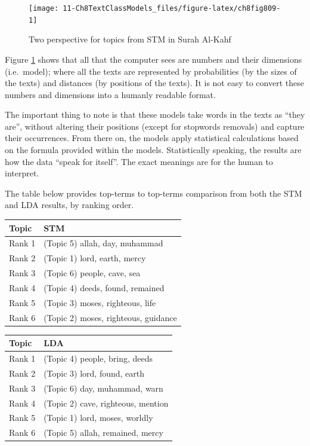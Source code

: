 \documentclass[
]{article}
\begin{document}
\begin{figure}

{\centering \texttt{[image: 11-Ch8TextClassModels\_files/figure-latex/ch8fig809-1]} 

}

\caption{Two perspective for topics from STM in Surah Al-Kahf}\label{fig:ch8fig809}
\end{figure}

Figure \ref{fig:ch8fig809} shows that all that the computer sees are numbers and their dimensions (i.e.~model); where all the texts are represented by probabilities (by the sizes of the texts) and distances (by positions of the texts). It is not easy to convert these numbers and dimensions into a humanly readable format.

The important thing to note is that these models take words in the texts as ``they are'', without altering their positions (except for stopwords removals) and capture their occurrences. From there on, the models apply statistical calculations based on the formula provided within the models. Statistically speaking, the results are how the data ``speak for itself''. The exact meanings are for the human to interpret.

The table below provides top-terms to top-terms comparison from both the STM and LDA results, by ranking order.

\begin{longtable}[]{@{}ll@{}}
\toprule\noalign{}
Topic & STM \\
\midrule\noalign{}
\endhead
\bottomrule\noalign{}
\endlastfoot
Rank 1 & (Topic 5) allah, day, muhammad \\
Rank 2 & (Topic 1) lord, earth, mercy \\
Rank 3 & (Topic 6) people, cave, sea \\
Rank 4 & (Topic 4) deeds, found, remained \\
Rank 5 & (Topic 3) moses, righteous, life \\
Rank 6 & (Topic 2) moses, righteous, guidance \\
\end{longtable}

\begin{longtable}[]{@{}ll@{}}
\toprule\noalign{}
Topic & LDA \\
\midrule\noalign{}
\endhead
\bottomrule\noalign{}
\endlastfoot
Rank 1 & (Topic 4) people, bring, deeds \\
Rank 2 & (Topic 3) lord, found, earth \\
Rank 3 & (Topic 6) day, muhammad, warn \\
Rank 4 & (Topic 2) cave, righteous, mention \\
Rank 5 & (Topic 1) lord, moses, worldly \\
Rank 6 & (Topic 5) allah, remained, mercy \\
\end{longtable}
\end{document}
